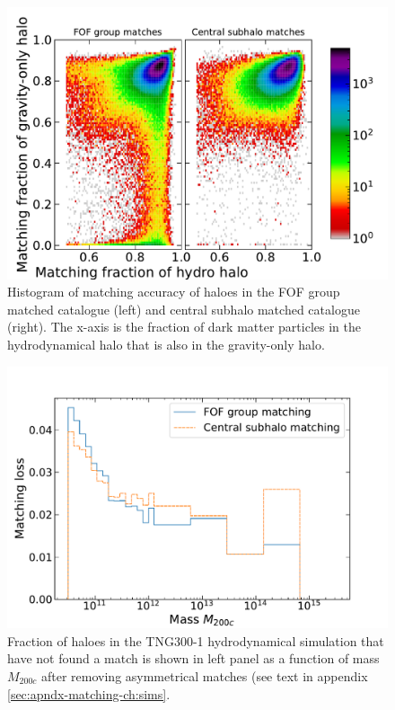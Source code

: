 \begin{figure}
\centering
\includegraphics[width=\linewidth]{plots/hal_match_accuracy_hist2d.pdf}
\caption{Histogram of matching accuracy of haloes in the FOF group matched catalogue (left) and central subhalo matched catalogue (right). The x-axis is the fraction of dark matter particles in the hydrodynamical halo that is also in the gravity-only halo.}
\label{fig:accuracy-hist2d-ch:sims}
\end{figure}

\begin{figure}
    \includegraphics[width=\linewidth]{plots/hal_match_efficiency_mass_rev.pdf}
    \caption{Fraction of haloes in the TNG300-1 hydrodynamical simulation that have not found a match is shown in left panel as a function of mass $M_{200c}$ after removing asymmetrical matches (see text in appendix \ref{sec:apndx-matching-ch:sims}.}
    \label{fig:efficiency-mass-rev-ch:sims}
\end{figure}

